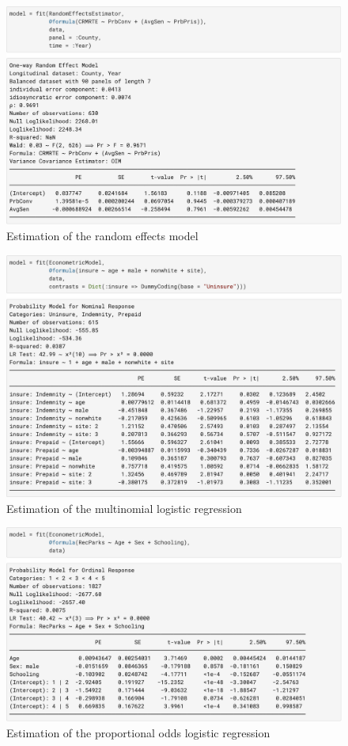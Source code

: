\documentclass{juliacon}
\begin{document}
\begin{figure}[hbpt]
	\includegraphics[max width=\linewidth,center]{estimator_ivre}
	\caption{Estimation of the random effects model}
	\label{random}
\end{figure}

\begin{figure}[hbpt]
	\includegraphics[max width=\linewidth,center]{estimator_mlogit}
	\caption{Estimation of the multinomial logistic regression}
	\label{mlogit}
\end{figure}

\begin{figure}[hbpt]
	\includegraphics[max width=\linewidth,center]{estimator_ologit}
	\caption{Estimation of the proportional odds logistic regression}
	\label{ologit}
\end{figure}
\end{document}
